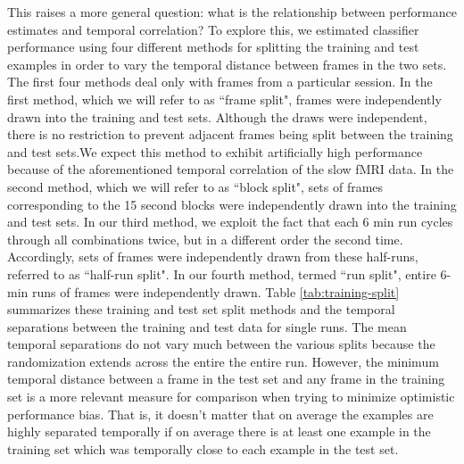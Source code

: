 \documentclass[review,1p,authoryear]{elsarticle}
\begin{document}
This raises a more general question: what is the relationship between performance estimates and temporal correlation?
To explore this, we estimated classifier performance using four different methods for splitting the training and test examples in order to vary the temporal distance between frames in the two sets. 
The first four methods deal only with frames from a particular session.
In the first method, which we will refer to as  ``frame split", frames were independently drawn into the training and test sets. 
Although the draws were independent, there is no restriction to prevent adjacent frames being split between the training and test sets.We expect this method to exhibit artificially high performance because of the aforementioned temporal correlation of the slow fMRI data.
In the second method, which we will refer to as ``block split", sets of frames corresponding to the 15 second blocks were independently drawn into the training and test sets.
In our third method, we exploit the fact that each 6 min run cycles through all combinations twice, but in a different order the second time.
Accordingly, sets of frames were independently drawn from these half-runs, referred to as ``half-run split". 
In our fourth method, termed ``run split", entire 6-min runs of frames were independently drawn. 
Table \ref{tab:training-split} summarizes these training and test set split methods and the temporal separations between the training and test data for single runs. 
The mean temporal separations do not vary much between the various splits because the randomization extends across the entire the entire run. 
However, the minimum temporal distance between a frame in the test set and any frame in the training set is a more relevant measure for comparison when trying to minimize optimistic performance bias.
That is, it doesn't matter that on average the examples are highly separated temporally if on average there is at least one example in the training set which was temporally close to each example in the test set.

\end{document}
